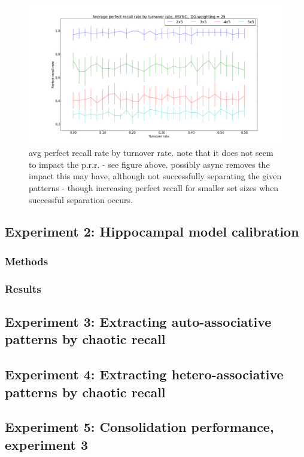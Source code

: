 \begin{figure}[h!]
    \centering
    \includegraphics[width=13cm]{fig/avg_perfect_recall_rate_by_turnover_rate_async_dgw_25.png}
    \caption{avg perfect recall rate by turnover rate. note that it does not seem to impact the p.r.r. - see figure above. possibly async removes the impact this may have, although not successfully separating the given patterns - though increasing perfect recall for smaller set sizes when successful separation occurs.}
    \label{fig:avg_perfect_recall_rate_by_turnover_rate_async_dgw_25}
\end{figure}

\subsection{Experiment 2: Hippocampal model calibration}
\subsubsection{Methods}
\subsubsection{Results}

\subsection{Experiment 3: Extracting auto-associative patterns by chaotic recall}
\subsection{Experiment 4: Extracting hetero-associative patterns by chaotic recall}

\subsection{Experiment 5: Consolidation performance, experiment 3}
